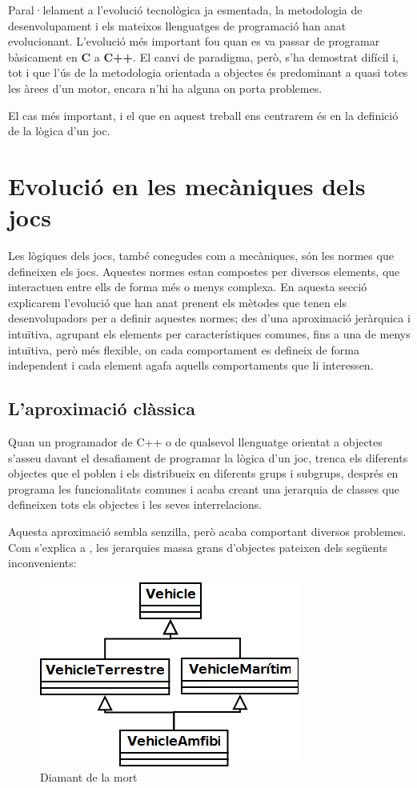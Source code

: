 Paral·lelament a l'evolució tecnològica ja esmentada, la metodologia de desenvolupament i els mateixos llenguatges de programació han anat evolucionant. L'evolució més important fou quan es va passar de programar bàsicament en {\bf C} a {\bf C++}. El canvi de paradigma, però, s'ha demostrat difícil i, tot i que l'ús de la metodologia orientada a objectes és predominant a quasi totes les àrees d'un motor, encara n'hi ha alguna on porta problemes.

El cas més important, i el que en aquest treball ens centrarem és en la definició de la lògica d'un joc.

\section{Evolució en les mecàniques dels jocs}

Les lògiques dels jocs, també conegudes com a mecàniques, són les normes que defineixen els jocs. Aquestes normes estan compostes per diversos elements, que interactuen entre ells de forma més o menys complexa. En aquesta secció explicarem l'evolució que han anat prenent els mètodes que tenen els desenvolupadors per a definir aquestes normes; des d'una aproximació jeràrquica i intuïtiva, agrupant els elements per característiques comunes, fins a una de menys intuïtiva, però més flexible, on cada comportament es defineix de forma independent i cada element agafa aquells comportaments que li interessen.

\subsection{L'aproximació clàssica}

Quan un programador de {C++} o de qualsevol llenguatge orientat a objectes s'asseu davant el desafiament de programar la lògica d'un joc, trenca els diferents objectes que el poblen i els distribueix en diferents grups i subgrups, després en programa les funcionalitats comunes i acaba creant una jerarquia de classes que defineixen tots els objectes i les seves interrelacions. 

Aquesta aproximació sembla senzilla, però acaba comportant diversos problemes. Com s'explica a \citep[p.~719]{Gregory09}, les jerarquies massa grans d'objectes pateixen dels següents inconvenients:


\begin{figure}
  \centering
  \includegraphics[width=0.58\linewidth]{./img/RombeMort.png}
  \caption{Diamant de la mort \label{fig:RombeMort}}
\end{figure}

